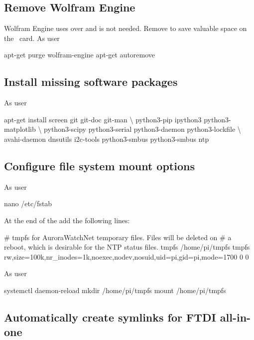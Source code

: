 \subsection{Remove Wolfram Engine}
Wolfram Engine uses over  and is not needed. Remove to save
valuable space on the \sd\ card. As user \rootUser
\begin{Cmd}
apt-get purge wolfram-engine
apt-get autoremove
\end{Cmd}


\subsection{Install missing software packages}
As user \rootUser
\begin{Cmd}
apt-get install screen git git-doc git-man \textbackslash
    python3-pip ipython3 python3-matplotlib \textbackslash
    python3-scipy python3-serial python3-daemon python3-lockfile \textbackslash
    avahi-daemon dnsutils i2c-tools python3-smbus python3-smbus ntp
\end{Cmd}

\subsection{Configure file system mount options}

As user \rootUser
\begin{Cmd}
nano /etc/fstab  
\end{Cmd}

At the end of the  add the following lines:
\begin{Cmd}[fontsize=\relsize{-2.5}]
# tmpfs for AuroraWatchNet temporary files. Files will be deleted on 
# a reboot, which is desirable for the NTP status files.
tmpfs  /home/pi/tmpfs  tmpfs  rw,size=100k,nr_inodes=1k,noexec,nodev,nosuid,uid=pi,gid=pi,mode=1700  0  0
\end{Cmd}

As user \rootUser
\begin{Cmd}
systemctl daemon-reload
mkdir /home/pi/tmpfs
mount /home/pi/tmpfs
\end{Cmd}

\subsection{Automatically create symlinks for FTDI all-in-one}

